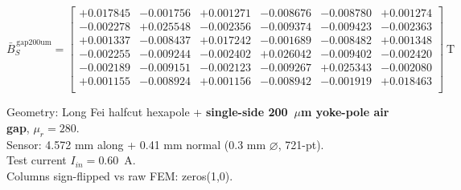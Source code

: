 \[
\bar{B}_S^{\,\mathrm{gap200um}} =
\begin{bmatrix}
 +0.017845 &  -0.001756 &  +0.001271 &  -0.008676 &  -0.008780 &  +0.001274 \\
 -0.002278 &  +0.025548 &  -0.002356 &  -0.009374 &  -0.009423 &  -0.002363 \\
 +0.001337 &  -0.008437 &  +0.017242 &  -0.001689 &  -0.008482 &  +0.001348 \\
 -0.002255 &  -0.009244 &  -0.002402 &  +0.026042 &  -0.009402 &  -0.002420 \\
 -0.002189 &  -0.009151 &  -0.002123 &  -0.009267 &  +0.025343 &  -0.002080 \\
 +0.001155 &  -0.008924 &  +0.001156 &  -0.008942 &  -0.001919 &  +0.018463 \\
\end{bmatrix}\ \mathrm{T}
\]

\noindent Geometry: Long Fei halfcut hexapole + \textbf{single-side 200~$\mu$m yoke-pole air gap}, $\mu_r = 280$.\\
Sensor: 4.572 mm along + 0.41 mm normal (0.3 mm $\varnothing$, 721-pt).\\
Test current $I_{in} = 0.60$~A.\\
Columns sign-flipped vs raw FEM: zeros(1,0).
